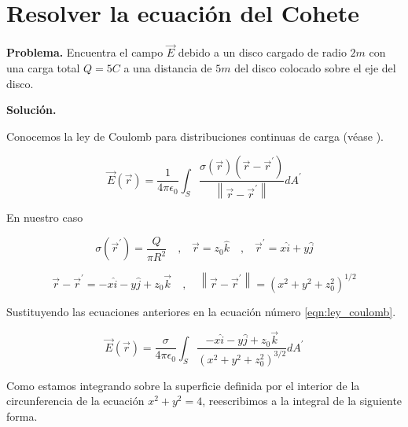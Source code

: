 \section{Resolver la ecuación del Cohete}

\vspace{0.5cm}

\noindent \textbf{Problema.} Encuentra el campo $\vec{E}$ debido a un disco cargado de 
radio $2m$ con una carga total $Q=5 C$ a una distancia de $5m$ del
disco colocado sobre el eje del disco.

\vspace{0.5cm}

\textbf{Solución.}

Conocemos la ley de Coulomb para distribuciones continuas de carga (véase \cite{griffiths2005introduction}).

\begin{equation}
    \vec{E} (\vec{r}) = \frac{1}{4\pi \epsilon_0} 
    \displaystyle\int_{S} \frac{\sigma(\vec{r}) \left( \vec{r} - \vec{r}^{'}  \right) }{\left\lVert \vec{r} - \vec{r}^{'} \right\rVert } dA^{'}
    \label{eqn:ley_coulomb}
\end{equation}

En nuestro caso

\begin{equation*}
    \sigma(\vec{r}^{'}) = \frac{Q}{\pi R^2} 
    \quad \text{,} \quad
    \vec{r} = z_0 \hat{k}
    \quad \text{,} \quad
    \vec{r}^{'} = x \hat{i} + y \hat{j}
\end{equation*}

\begin{equation*}
    \vec{r} - \vec{r}^{'} =
    -x \hat{i} - y \hat{j} + z_{0} \vec{k}
    \quad , \quad
    \left\lVert \vec{r} - \vec{r}^{'} \right\rVert 
    = 
    \left( x^2 + y^2 + z_{0}^{2} \right)^{1/2}
\end{equation*}

Sustituyendo las ecuaciones anteriores en la ecuación número \ref{eqn:ley_coulomb}.

\begin{equation}
    \vec{E} (\vec{r}) = \frac{\sigma}{4\pi \epsilon_0} 
    \displaystyle\int_{S} \frac{ -x \hat{i} - y \hat{j} + z_{0} \vec{k} }{\left( x^2 + y^2 + z_{0}^{2} \right)^{3/2}} dA^{'}
\end{equation}

Como estamos integrando sobre la superficie definida por el interior de la circunferencia de la ecuación $ x^2 + y^2 = 4 $, reescribimos a la integral de la siguiente forma.


